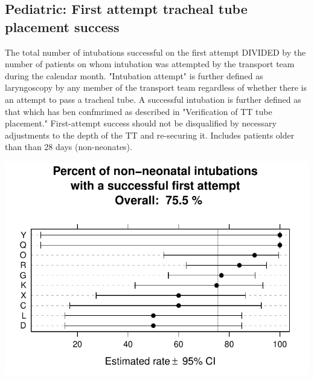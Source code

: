 \documentclass[twoside]{article}\usepackage[]{graphicx}\usepackage[]{color}
\makeatletter
\def\maxwidth{ %
  \ifdim\Gin@nat@width>\linewidth
    \linewidth
  \else
    \Gin@nat@width
  \fi
}
\newenvironment{knitrout}{}{} %
\makeatother
\begin{document}
\newpage
\subsection{Pediatric: First attempt tracheal tube placement success}
The total number of intubations successful on the first attempt DIVIDED by the number of patients on whom intubation was attempted by the transport team during the calendar month. "Intubation attempt" is further defined as laryngoscopy by any member of the transport team regardless of whether there is an attempt to pass a tracheal tube. A successful intubation is further defined as that which has ben confmrimed as described in "Verification of TT tube placement." First-attempt success should not be disqualified by necessary adjustments to the depth of the TT and re-securing it. Includes patients older than than 28 days (non-neonates).

\begin{center}
\begin{knitrout}
\color{fgcolor}
\includegraphics[width=\maxwidth]{figure/r_pediatric_intubation_success} 

\end{knitrout}

\end{center}
\end{document}
